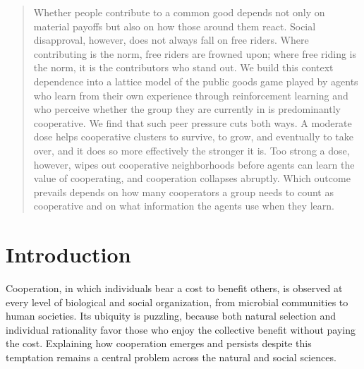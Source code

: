 \documentclass[%
  aip,cha,
  amsmath,amssymb,
  reprint,
  article-title,
]{revtex4-2}
\begin{document}

\maketitle

\begin{quotation}
Whether people contribute to a common good depends not only on material payoffs but also on how those around them react. Social disapproval, however, does not always fall on free riders. Where contributing is the norm, free riders are frowned upon; where free riding is the norm, it is the contributors who stand out. We build this context dependence into a lattice model of the public goods game played by agents who learn from their own experience through reinforcement learning and who perceive whether the group they are currently in is predominantly cooperative. We find that such peer pressure cuts both ways. A moderate dose helps cooperative clusters to survive, to grow, and eventually to take over, and it does so more effectively the stronger it is. Too strong a dose, however, wipes out cooperative neighborhoods before agents can learn the value of cooperating, and cooperation collapses abruptly. Which outcome prevails depends on how many cooperators a group needs to count as cooperative and on what information the agents use when they learn.
\end{quotation}

\section{Introduction}\label{sec:intro}

Cooperation, in which individuals bear a cost to benefit others, is observed at every level of biological and social organization, from microbial communities to human societies.\cite{axelrod1981evolution,rand2013human}
Its ubiquity is puzzling, because both natural selection and individual rationality favor those who enjoy the collective benefit without paying the cost.\cite{olson1971logic,sigmund2010calculus}
Explaining how cooperation emerges and persists despite this temptation remains a central problem across the natural and social sciences.\cite{pennisi2005did}
\end{document}
